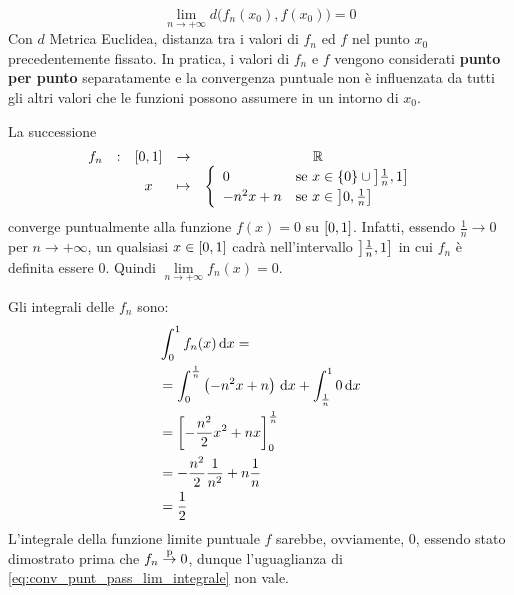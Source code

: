\[\lim\limits_{n \to +\infty} d \bigl( f_n(x_0), f(x_0) \bigr) = 0\]
Con $d$ Metrica Euclidea, distanza tra i valori di $f_n$ ed $f$ nel punto $x_0$ precedentemente fissato. In pratica, i valori di $f_n$ e $f$ vengono considerati \textbf{punto per punto} separatamente e la convergenza puntuale non è influenzata da tutti gli altri valori che le funzioni possono assumere in un intorno di $x_0$.
\begin{example}
	\label{ex:conv_punt_no_pass_lim_integrale}
	La successione
	\[
		\begin{array}{ccccc} {f_n} & : & {\left[0,1\right]} & \to & {\mathbb{R}} \\ & & {x} & \mapsto & {
			\begin{cases}
				\begin{array}{ll}
					0 & \text{se } x \in \left\{0\right\} \cup \left]\frac{1}{n},1\right]\\
					-n^2x + n & \text{se } x \in \left]0,\frac{1}{n}\right]
				\end{array}
			\end{cases}
		} \\ \end{array}
	\]
	converge puntualmente alla funzione $f(x) = 0$ su $\left[0,1\right]$. Infatti, essendo $\frac{1}{n} \to 0$ per $n \to +\infty$, un qualsiasi $x \in \left[0,1\right]$ cadrà nell'intervallo $\left]\frac{1}{n},1\right]$ in cui $f_n$ è definita essere $0$. Quindi $\lim\limits_{n \to +\infty} f_n(x) = 0$.
	\begin{center}
	\end{center}
	Gli integrali delle $f_n$ sono:
	\begin{align*}
		&\int_0^1 f_n(x) \,\mathrm{d}{x} =\\
		&= \int_0^{\frac{1}{n}} \left( -n^2x + n \right)\,\mathrm{d}{x} + \int_{\frac{1}{n}}^1 0 \,\mathrm{d}{x}\\
		&= \left[ -\frac{n^2}{2}x^2 + nx \right]_0^{\frac{1}{n}}\\
		&= -\frac{n^2}{2}\frac{1}{n^2} + n \frac{1}{n}\\
		&= \frac{1}{2}
	\end{align*}
	L'integrale della funzione limite puntuale $f$ sarebbe, ovviamente, $0$, essendo stato dimostrato prima che $f_n \overset{\text{p}}{\to} 0$, dunque l'uguaglianza di \cref{eq:conv_punt_pass_lim_integrale} non vale.
\end{example}
\cbend

